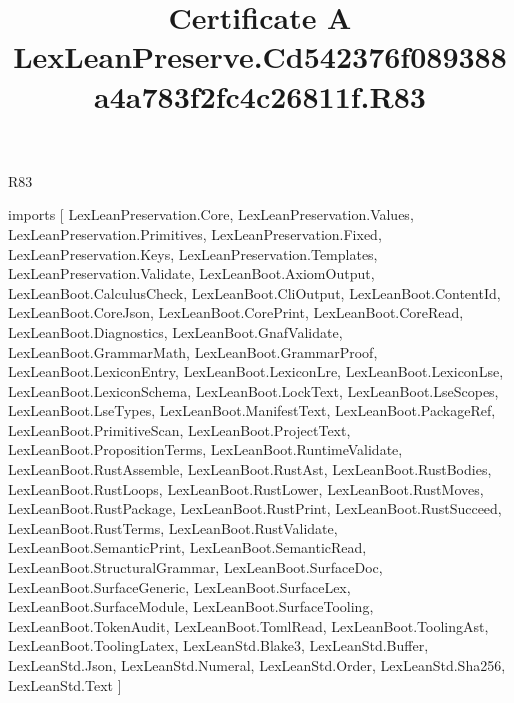 \begin{lexlean}{R83}
\title{Certificate A LexLeanPreserve.Cd542376f089388a4a783f2fc4c26811f.R83}
\begin{coremodule}
imports [
  LexLeanPreservation.Core,
  LexLeanPreservation.Values,
  LexLeanPreservation.Primitives,
  LexLeanPreservation.Fixed,
  LexLeanPreservation.Keys,
  LexLeanPreservation.Templates,
  LexLeanPreservation.Validate,
  LexLeanBoot.AxiomOutput,
  LexLeanBoot.CalculusCheck,
  LexLeanBoot.CliOutput,
  LexLeanBoot.ContentId,
  LexLeanBoot.CoreJson,
  LexLeanBoot.CorePrint,
  LexLeanBoot.CoreRead,
  LexLeanBoot.Diagnostics,
  LexLeanBoot.GnafValidate,
  LexLeanBoot.GrammarMath,
  LexLeanBoot.GrammarProof,
  LexLeanBoot.LexiconEntry,
  LexLeanBoot.LexiconLre,
  LexLeanBoot.LexiconLse,
  LexLeanBoot.LexiconSchema,
  LexLeanBoot.LockText,
  LexLeanBoot.LseScopes,
  LexLeanBoot.LseTypes,
  LexLeanBoot.ManifestText,
  LexLeanBoot.PackageRef,
  LexLeanBoot.PrimitiveScan,
  LexLeanBoot.ProjectText,
  LexLeanBoot.PropositionTerms,
  LexLeanBoot.RuntimeValidate,
  LexLeanBoot.RustAssemble,
  LexLeanBoot.RustAst,
  LexLeanBoot.RustBodies,
  LexLeanBoot.RustLoops,
  LexLeanBoot.RustLower,
  LexLeanBoot.RustMoves,
  LexLeanBoot.RustPackage,
  LexLeanBoot.RustPrint,
  LexLeanBoot.RustSucceed,
  LexLeanBoot.RustTerms,
  LexLeanBoot.RustValidate,
  LexLeanBoot.SemanticPrint,
  LexLeanBoot.SemanticRead,
  LexLeanBoot.StructuralGrammar,
  LexLeanBoot.SurfaceDoc,
  LexLeanBoot.SurfaceGeneric,
  LexLeanBoot.SurfaceLex,
  LexLeanBoot.SurfaceModule,
  LexLeanBoot.SurfaceTooling,
  LexLeanBoot.TokenAudit,
  LexLeanBoot.TomlRead,
  LexLeanBoot.ToolingAst,
  LexLeanBoot.ToolingLatex,
  LexLeanStd.Blake3,
  LexLeanStd.Buffer,
  LexLeanStd.Json,
  LexLeanStd.Numeral,
  LexLeanStd.Order,
  LexLeanStd.Sha256,
  LexLeanStd.Text
]


\end{coremodule}
\end{lexlean}
